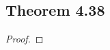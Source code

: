 \documentclass[../../main.tex]{subfiles}
\begin{document}
\subsection{Theorem 4.38}
\begin{wts}

\end{wts}
\begin{proof}

\end{proof}
\end{document}
